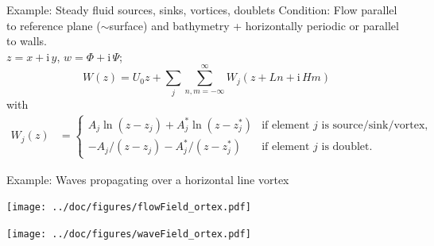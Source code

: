 \documentclass{sintefbeamer}
\newcommand{\mr}{\mathrm}
\newcommand{\ii}{\mr{i}\,}
\renewcommand{\_}[1]{_\mr{#1}}
\begin{document}
\begin{frame}{Example: Steady fluid sources, sinks, vortices, doublets}
	Condition: Flow parallel to reference plane ($\sim$surface) and bathymetry + horizontally periodic or parallel to walls.\\
	$z=x+\ii y$, $w=\Phi + \ii\Psi$;
	\begin{equation*}
		W(z) =  U_0 z + \sum_j \sum_{n,m=-\infty}^{\infty} W_j(z + L n + \ii H m)
	\end{equation*}
	with
	\begin{align*}
		W_j(z) &= 
		\begin{cases}
			A_j\ln(z-z_j) + A_j^*\ln(z-z_j^*) & \text{if element $j$ is source/sink/vortex,}\\
			-A_j/(z-z_j)-A_j^*/(z-z_j^*) & \text{if element $j$ is doublet.}
		\end{cases}
	\end{align*}
\end{frame}

\begin{frame}{Example: Waves propagating over a horizontal line vortex}
\centering
\vspace{-.25cm}
\begin{minipage}{.5\framewidth}
\texttt{[image: ../doc/figures/flowField\_vortex.pdf]}%
\end{minipage}%
\texttt{[image: ../doc/figures/waveField\_vortex.pdf]}%
\end{frame}
\end{document}
